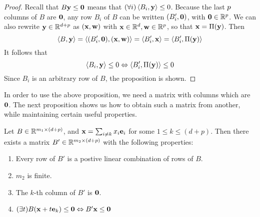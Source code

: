 \begin{proof}
	Recall that $B\mathbf{y} \leq \mathbf{0}$ means that $(\forall i)\left\langle B_i, \mathbf{y} \right\rangle \leq 0$.  Because the last $p$ columns of $B$ are $\mathbf{0}$, any row $B_i$ of $B$ can be written $(B'_i,\mathbf{0})$, with $\mathbf{0} \in \mathbb{R}^p$.  We can also rewrite $\mathbf{y}\in\mathbb{R}^{d+p}$ as $(\mathbf{x},\mathbf{w})$ with $\mathbf{x}\in\mathbb{R}^d,\mathbf{w}\in\mathbb{R}^p$, so that $\mathbf{x} = \Pi(\mathbf{y})$.  Then
	\[ \left\langle B, \mathbf{y} \right\rangle = \left\langle (B'_i,\mathbf{0}), (\mathbf{x},\mathbf{w}) \right\rangle = \left\langle B'_i, \mathbf{x} \right\rangle = \left\langle B'_i, \Pi(\mathbf{y}) \right\rangle \]
	It follows that
	\[ \left\langle B_i, \mathbf{y} \right\rangle \leq 0 \Leftrightarrow \left\langle B'_i, \Pi(\mathbf{y}) \right\rangle \leq 0 \]
	Since $B_i$ is an arbitrary row of $B$, the proposition is shown.
\end{proof}

In order to use the above proposition, we need a matrix with columns which are $\mathbf{0}$.  The next proposition shows us how to obtain such a matrix from another, while maintaining certain useful properties.

\begin{Prop}\label{fm_hcone}
	Let $B \in \mathbb{R}^{m_1\times (d+p)}$, and $\mathbf{x} = \sum_{i\neq k}x_i \mathbf{e}_i$ for some $1 \leq k \leq (d+p)$.  Then there exists a matrix $B' \in \mathbb{R}^{m_2\times (d+p)}$ with the following properties:
	\begin{enumerate}
		\item Every row of $B'$ is a postive linear combination of rows of $B$.
		\item $m_2$ is finite.
		\item The $k$-th column of $B'$ is $\mathbf{0}$.
		\item \((\exists t)B(\mathbf{x} + t\mathbf{e}_k) \leq \mathbf{0} \Leftrightarrow B'\mathbf{x} \leq \mathbf{0}\)
	\end{enumerate}
\end{Prop}

